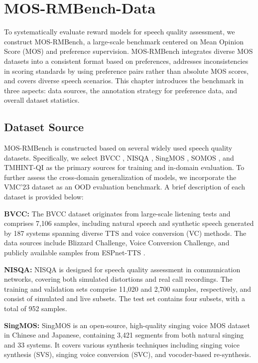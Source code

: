 \section{MOS-RMBench-Data}
To systematically evaluate reward models for speech quality assessment, we construct MOS-RMBench, a large-scale benchmark centered on Mean Opinion Score (MOS) and preference supervision. MOS-RMBench integrates diverse MOS datasets into a consistent format based on preferences, addresses inconsistencies in scoring standards by using preference pairs rather than absolute MOS scores, and covers diverse speech scenarios. This chapter introduces the benchmark in three aspects: data sources, the annotation strategy for preference data, and overall dataset statistics.

\subsection{Dataset Source}
MOS-RMBench is constructed based on several widely used speech quality datasets. Specifically, we select BVCC \citep{bvcc}, NISQA \citep{nisqa}, SingMOS \citep{singmos}, SOMOS \citep{somos}, and TMHINT-QI \citep{tmhint-qi} as the primary sources for training and in-domain evaluation. To further assess the cross-domain generalization of models, we incorporate the VMC'23 \cite{vmc23} dataset as an OOD evaluation benchmark. A brief description of each dataset is provided below:

\textbf{BVCC:} The BVCC dataset originates from large-scale listening tests and comprises 7,106 samples, including natural speech and synthetic speech generated by 187 systems spanning diverse TTS and voice conversion (VC) methods. The data sources include Blizzard Challenge, Voice Conversion Challenge, and publicly available samples from ESPnet-TTS \citep{hayashi2020espnet}.

\textbf{NISQA:} NISQA is designed for speech quality assessment in communication networks, covering both simulated distortions and real call recordings. The training and validation sets comprise 11,020 and 2,700 samples, respectively, and consist of simulated and live subsets. The test set contains four subsets, with a total of 952 samples.

\textbf{SingMOS:} SingMOS is an open-source, high-quality singing voice MOS dataset in Chinese and Japanese, containing 3,421 segments from both natural singing and 33 systems. It covers various synthesis techniques including singing voice synthesis (SVS), singing voice conversion (SVC), and vocoder-based re-synthesis.

